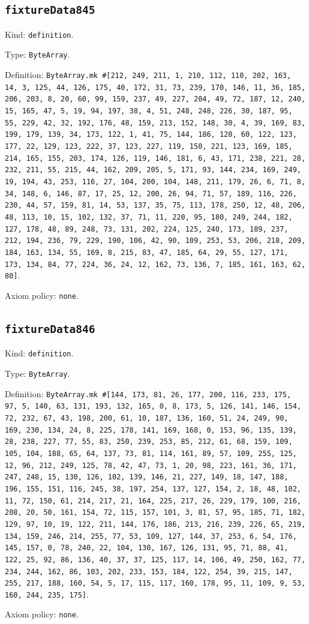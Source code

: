 \documentclass[11pt]{article}
\begin{document}
\subsection*{\texttt{fixtureData845}}
\noindent Kind: \texttt{definition}.\par
\noindent Type: \texttt{ByteArray}.\par
\noindent Definition: \texttt{ByteArray.mk \#[212, 249, 211, 1, 210, 112, 110, 202, 163, 14, 3, 125, 44, 126, 175, 40, 172, 31, 73, 239, 170, 146, 11, 36, 185, 206, 203, 8, 20, 60, 99, 159, 237, 49, 227, 204, 49, 72, 187, 12, 240, 15, 165, 47, 5, 19, 94, 197, 38, 4, 51, 248, 248, 226, 30, 187, 95, 55, 229, 42, 32, 192, 176, 48, 159, 213, 152, 148, 30, 4, 39, 169, 83, 199, 179, 139, 34, 173, 122, 1, 41, 75, 144, 186, 120, 60, 122, 123, 177, 22, 129, 123, 222, 37, 123, 227, 119, 150, 221, 123, 169, 185, 214, 165, 155, 203, 174, 126, 119, 146, 181, 6, 43, 171, 238, 221, 28, 232, 211, 55, 215, 44, 162, 209, 205, 5, 171, 93, 144, 234, 169, 249, 19, 194, 43, 253, 116, 27, 104, 200, 104, 148, 211, 179, 26, 6, 71, 8, 34, 148, 6, 146, 87, 17, 25, 12, 200, 26, 94, 71, 57, 189, 116, 226, 230, 44, 57, 159, 81, 14, 53, 137, 35, 75, 113, 178, 250, 12, 48, 206, 48, 113, 10, 15, 102, 132, 37, 71, 11, 220, 95, 180, 249, 244, 182, 127, 178, 48, 89, 248, 73, 131, 202, 224, 125, 240, 173, 189, 237, 212, 194, 236, 79, 229, 190, 106, 42, 90, 109, 253, 53, 206, 218, 209, 184, 163, 134, 55, 169, 8, 215, 83, 47, 185, 64, 29, 55, 127, 171, 173, 134, 84, 77, 224, 36, 24, 12, 162, 73, 136, 7, 185, 161, 163, 62, 80]}.\par
\noindent Axiom policy: \texttt{none}.\par
\subsection*{\texttt{fixtureData846}}
\noindent Kind: \texttt{definition}.\par
\noindent Type: \texttt{ByteArray}.\par
\noindent Definition: \texttt{ByteArray.mk \#[144, 173, 81, 26, 177, 200, 116, 233, 175, 97, 5, 140, 63, 131, 193, 132, 165, 0, 8, 173, 5, 126, 141, 146, 154, 72, 232, 67, 43, 198, 200, 61, 10, 187, 136, 160, 51, 24, 249, 90, 169, 230, 134, 24, 8, 225, 178, 141, 169, 168, 0, 153, 96, 135, 139, 28, 238, 227, 77, 55, 83, 250, 239, 253, 85, 212, 61, 68, 159, 109, 105, 104, 188, 65, 64, 137, 73, 81, 114, 161, 89, 57, 109, 255, 125, 12, 96, 212, 249, 125, 78, 42, 47, 73, 1, 20, 98, 223, 161, 36, 171, 247, 248, 15, 130, 126, 102, 139, 146, 21, 227, 149, 18, 147, 188, 196, 155, 151, 116, 245, 38, 197, 254, 137, 127, 154, 2, 18, 48, 102, 11, 72, 150, 61, 214, 217, 21, 164, 225, 217, 26, 229, 179, 100, 216, 208, 20, 50, 161, 154, 72, 115, 157, 101, 3, 81, 57, 95, 185, 71, 182, 129, 97, 10, 19, 122, 211, 144, 176, 186, 213, 216, 239, 226, 65, 219, 134, 159, 246, 214, 255, 77, 53, 109, 127, 144, 37, 253, 6, 54, 176, 145, 157, 0, 78, 240, 22, 104, 130, 167, 126, 131, 95, 71, 88, 41, 122, 25, 92, 86, 136, 40, 37, 37, 125, 117, 14, 106, 49, 250, 162, 77, 234, 244, 162, 86, 103, 202, 233, 153, 184, 122, 254, 39, 215, 147, 255, 217, 188, 160, 54, 5, 17, 115, 117, 160, 178, 95, 11, 109, 9, 53, 160, 244, 235, 175]}.\par
\noindent Axiom policy: \texttt{none}.\par
\end{document}
